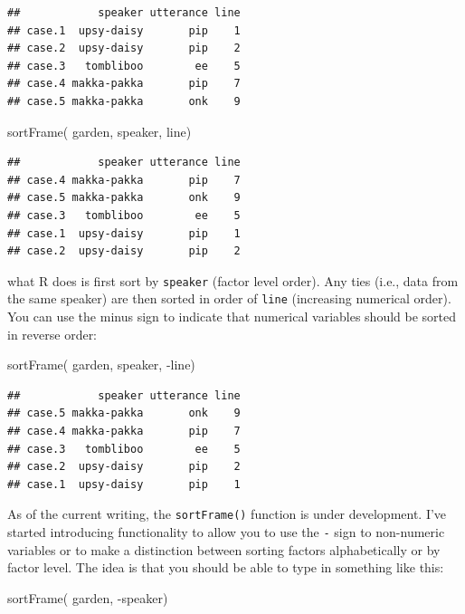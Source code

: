 \documentclass[
]{book}
\newenvironment{Shaded}{\begin{snugshade}}{\end{snugshade}}
\newcommand{\FunctionTok}[1]{\textcolor[rgb]{0.00,0.00,0.00}{#1}}
\newcommand{\NormalTok}[1]{#1}
\newcommand{\SpecialCharTok}[1]{\textcolor[rgb]{0.00,0.00,0.00}{#1}}
\begin{document}
\begin{verbatim}
##            speaker utterance line
## case.1  upsy-daisy       pip    1
## case.2  upsy-daisy       pip    2
## case.3   tombliboo        ee    5
## case.4 makka-pakka       pip    7
## case.5 makka-pakka       onk    9
\end{verbatim}

\begin{Shaded}
\begin{Highlighting}[]
\FunctionTok{sortFrame}\NormalTok{( garden, speaker, line)}
\end{Highlighting}
\end{Shaded}

\begin{verbatim}
##            speaker utterance line
## case.4 makka-pakka       pip    7
## case.5 makka-pakka       onk    9
## case.3   tombliboo        ee    5
## case.1  upsy-daisy       pip    1
## case.2  upsy-daisy       pip    2
\end{verbatim}

what R does is first sort by \texttt{speaker} (factor level order). Any ties (i.e., data from the same speaker) are then sorted in order of \texttt{line} (increasing numerical order). You can use the minus sign to indicate that numerical variables should be sorted in reverse order:

\begin{Shaded}
\begin{Highlighting}[]
\FunctionTok{sortFrame}\NormalTok{( garden, speaker, }\SpecialCharTok{{-}}\NormalTok{line)}
\end{Highlighting}
\end{Shaded}

\begin{verbatim}
##            speaker utterance line
## case.5 makka-pakka       onk    9
## case.4 makka-pakka       pip    7
## case.3   tombliboo        ee    5
## case.2  upsy-daisy       pip    2
## case.1  upsy-daisy       pip    1
\end{verbatim}

As of the current writing, the \texttt{sortFrame()} function is under development. I've started introducing functionality to allow you to use the \texttt{-} sign to non-numeric variables or to make a distinction between sorting factors alphabetically or by factor level. The idea is that you should be able to type in something like this:

\begin{Shaded}
\begin{Highlighting}[]
\FunctionTok{sortFrame}\NormalTok{( garden, }\SpecialCharTok{{-}}\NormalTok{speaker)}
\end{Highlighting}
\end{Shaded}
\end{document}
